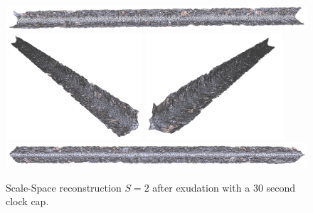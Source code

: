 \documentclass[12pt]{drexelthesis}
\begin{document}
\begin{figure}[!ht]
	\centering
		\includegraphics[width=5in]{simulated-lab-scan/0noise/optimizedNeat/scalespace2everything00.png}
		\includegraphics[width=2in]{simulated-lab-scan/0noise/optimizedNeat/scalespace2everything01.png}
		\includegraphics[width=2in]{simulated-lab-scan/0noise/optimizedNeat/scalespace2everything02.png}
		\includegraphics[width=5in]{simulated-lab-scan/0noise/optimizedNeat/scalespace2everything03.png}
		\caption[Scale-Space reconstruction $S = 2$ after exudation with a 30 second clock cap]{\centering Scale-Space reconstruction $S = 2$ after exudation with a 30 second clock cap.}
	\label{zeronoise:scalespace2everything}
\end{figure}
\end{document}
